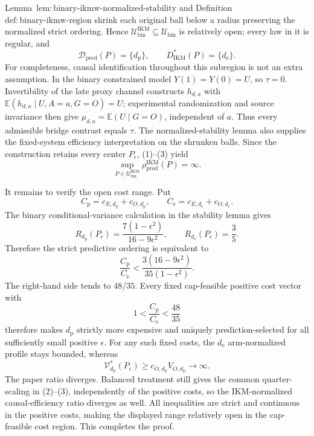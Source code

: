 Lemma~\(\mathrm{lem{:}binary\text{-}ikmw\text{-}normalized\text{-}stability}\) and Definition~\(\mathrm{def{:}binary\text{-}ikmw\text{-}region}\) shrink each original ball below a radius preserving the normalized strict ordering. Hence \(\mathcal U_{\mathrm{bin}}^{\mathrm{IKM}}\subseteq\mathcal U_{\mathrm{bin}}\) is relatively open; every law in it is regular, and
\[
 \mathcal D_{\mathrm{pred}}(P)=\{d_{\mathrm p}\},
 \qquad
 D_{\mathrm{IKM}}^*(P)=\{d_{\mathrm e}\}.
\]
For completeness, causal identification throughout this subregion is not an extra assumption. In the binary constrained model \(Y(1)=Y(0)=U\), so \(\tau=0\). Invertibility of the late proxy channel constructs \(h_{d,a}\) with \(\mathbb E(h_{d,a}\mid U,A=a,G=O)=U\); experimental randomization and source invariance then give \(\mu_{d,a}=\mathbb E(U\mid G=O)\), independent of \(a\). Thus every admissible bridge contrast equals \(\tau\). The normalized-stability lemma also supplies the fixed-system efficiency interpretation on the shrunken balls. Since the construction retains every center \(P_\epsilon\), (1)--(3) yield
\[
 \sup_{P\in\mathcal U_{\mathrm{bin}}^{\mathrm{IKM}}}
 \rho_{\mathrm{pred}}^{\mathrm{IKM}}(P)=\infty.             \tag{5}
\]

It remains to verify the open cost range. Put
\[
 C_{\mathrm p}=c_{E,d_{\mathrm p}}+c_{O,d_{\mathrm p}},
 \qquad
 C_{\mathrm e}=c_{E,d_{\mathrm e}}+c_{O,d_{\mathrm e}}.
\]
The binary conditional-variance calculation in the stability lemma gives
\[
 R_{d_{\mathrm p}}(P_\epsilon)
 =\frac{7(1-\epsilon^2)}{16-9\epsilon^2},
 \qquad
 R_{d_{\mathrm e}}(P_\epsilon)=\frac35.
\]
Therefore the strict predictive ordering is equivalent to
\[
 \frac{C_{\mathrm p}}{C_{\mathrm e}}
 <\frac{3(16-9\epsilon^2)}{35(1-\epsilon^2)}.               \tag{6}
\]
The right-hand side tends to \(48/35\). Every fixed cap-feasible positive cost vector with
\[
 1<\frac{C_{\mathrm p}}{C_{\mathrm e}}<\frac{48}{35}
\]
therefore makes \(d_{\mathrm p}\) strictly more expensive and uniquely prediction-selected for all sufficiently small positive \(\epsilon\). For any such fixed costs, the \(d_{\mathrm e}\) arm-normalized profile stays bounded, whereas
\[
 \mathcal V_{d_{\mathrm p}}^*(P_\epsilon)
 \ge c_{O,d_{\mathrm p}}V_{O,d_{\mathrm p}}\longrightarrow\infty.
\]
The paper ratio diverges. Balanced treatment still gives the common quarter-scaling in (2)--(3), independently of the positive costs, so the IKM-normalized causal-efficiency ratio diverges as well. All inequalities are strict and continuous in the positive costs, making the displayed range relatively open in the cap-feasible cost region. This completes the proof.
